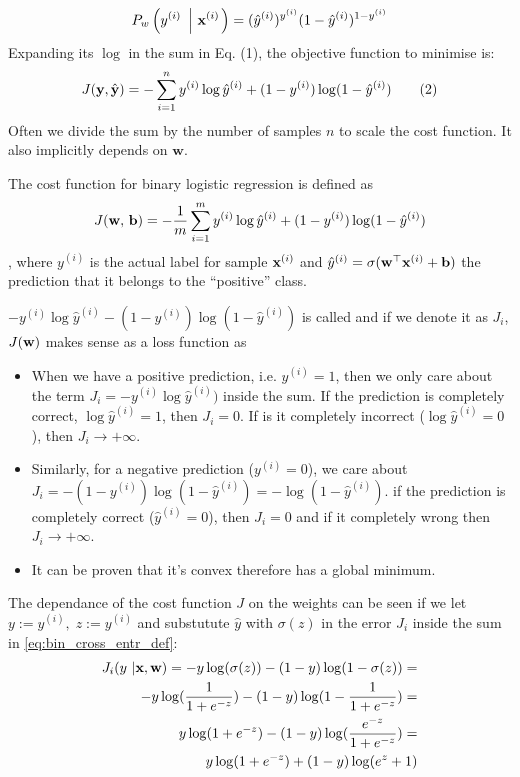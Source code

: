 \documentclass[a4paper]{article}
\begin{document}
\[
P_w\left( y^{(i)} \ \left| \ \textbf{x}^{(i)} \right. \right)=
(\hat{y}^{(i)})^{y^{(i)}} (1-\hat{y}^{(i)})^{1-y^{(i)}}
\]
Expanding its $\log$ in the sum in Eq. (1), the objective function to minimise is:
\begin{equation*}
    J(\textbf{y},\hat{\textbf{y}}) = 
    -\sum \limits _{i=1} ^{n}{
    y^{(i)}\log\hat{y}^{(i)} + (1-y^{(i)})\log(1-\hat{y}^{(i)})
    }
    \tag{2}
\end{equation*}
Often we divide the sum by the number of samples $n$ to scale the cost function. It also implicitly depends on $\textbf{w}$.
\begin{definition}
The cost function for binary logistic regression is defined as
\begin{equation}
        J(\textbf{w}, \, \textbf{b}) = 
    -\frac{1}{m}\sum \limits _{i=1} ^{m}{
    y^{(i)}\log\hat{y}^{(i)} + (1-y^{(i)})\log(1-\hat{y}^{(i)})
    }
    \label{eq:bin_cross_entr_def}
\end{equation}
, where $y^{(i)}$ is the actual label for sample $\textbf{x}^{(i)}$ and $\hat{y}^{(i)}=\sigma(\textbf{w}^{\top}\textbf{x}^{(i)} + \textbf{b})$ the prediction that it belongs to the ``positive'' class.
\end{definition}

$-y^{(i)}\log\hat{y}^{(i)} - (1-y^{(i)})\log(1-\hat{y}^{(i)})$ is called  and if we denote it as $J_i$, $J(\textbf{w})$ makes sense as a loss function as
\begin{itemize}
    \item When we have a positive prediction, i.e. $y^{(i)}=1$, then we only care about the term $J_i = -y^{(i)}\log\hat{y}^{(i)})$ inside the sum. If the prediction is completely correct, $\log\hat{y}^{(i)}=1$, then $J_i=0$. If is it completely incorrect ($\log\hat{y}^{(i)}=0$), then $J_i\rightarrow +\infty$.
    \item Similarly, for a negative prediction ($y^{(i)}=0$), we care about $J_i = -(1-y^{(i)})\log(1-\hat{y}^{(i)}) = -\log(1-\hat{y}^{(i)})$. if the prediction is completely correct ($\hat{y}^{(i)}=0$), then $J_i=0$ and if it completely wrong then $J_i\rightarrow +\infty$.  
    \item It can be proven that it's convex therefore has a global minimum.
\end{itemize}
The dependance of the cost function $J$ on the weights can be seen if we  let $y:=y^{(i)}, \; z:=y^{(i)}$ and substutute $\hat{y}$ with $\sigma(z)$ in the error $J_i$ inside the sum in \eqref{eq:bin_cross_entr_def}:
\[
\begin{split}
    J_i(y \ | \textbf{x}, \textbf{w}) = -y\log(\sigma(z)) - (1-y)\log(1-\sigma(z)) =  \\
    -y\log(\frac{1}{1+e^{-z}}) - (1-y)\log(1-\frac{1}{1+e^{-z}}) = \\
    y \log({1+e^{-z}}) - (1-y) \log(\frac{e^{-z}}{1+e^{-z}}) = \\
     y \log({1+e^{-z}}) + (1-y) \log(e^z+1)
\end{split}
\]
\end{document}
